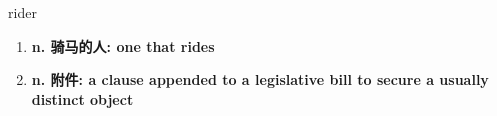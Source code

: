 
\begin{frame}
{\huge rider}
\begin{center}
\begin{enumerate}\Large
  \item \textbf{n. 骑马的人: one that rides}
  \item \textbf{n. 附件: a clause appended to a legislative bill to secure a usually distinct object}
\end{enumerate}
\end{center}
\end{frame}
